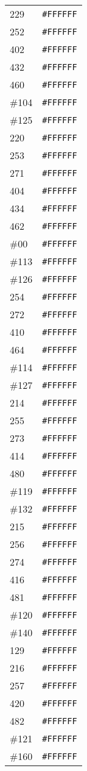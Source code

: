 \documentclass[a4paper]{article}
\begin{document}
\begin{longtable}{|l|r|}
229 & \texttt{\#FFFFFF} \\
252 & \texttt{\#FFFFFF} \\
402 & \texttt{\#FFFFFF} \\
432 & \texttt{\#FFFFFF} \\
460 & \texttt{\#FFFFFF} \\
\#104 & \texttt{\#FFFFFF} \\
\#125 & \texttt{\#FFFFFF} \\
220 & \texttt{\#FFFFFF} \\
253 & \texttt{\#FFFFFF} \\
271 & \texttt{\#FFFFFF} \\
404 & \texttt{\#FFFFFF} \\
434 & \texttt{\#FFFFFF} \\
462 & \texttt{\#FFFFFF} \\
\#00 & \texttt{\#FFFFFF} \\
\#113 & \texttt{\#FFFFFF} \\
\#126 & \texttt{\#FFFFFF} \\
254 & \texttt{\#FFFFFF} \\
272 & \texttt{\#FFFFFF} \\
410 & \texttt{\#FFFFFF} \\
464 & \texttt{\#FFFFFF} \\
\#114 & \texttt{\#FFFFFF} \\
\#127 & \texttt{\#FFFFFF} \\
214 & \texttt{\#FFFFFF} \\
255 & \texttt{\#FFFFFF} \\
273 & \texttt{\#FFFFFF} \\
414 & \texttt{\#FFFFFF} \\
480 & \texttt{\#FFFFFF} \\
\#119 & \texttt{\#FFFFFF} \\
\#132 & \texttt{\#FFFFFF} \\
215 & \texttt{\#FFFFFF} \\
256 & \texttt{\#FFFFFF} \\
274 & \texttt{\#FFFFFF} \\
416 & \texttt{\#FFFFFF} \\
481 & \texttt{\#FFFFFF} \\
\#120 & \texttt{\#FFFFFF} \\
\#140 & \texttt{\#FFFFFF} \\
129 & \texttt{\#FFFFFF} \\
216 & \texttt{\#FFFFFF} \\
257 & \texttt{\#FFFFFF} \\
420 & \texttt{\#FFFFFF} \\
482 & \texttt{\#FFFFFF} \\
\#121 & \texttt{\#FFFFFF} \\
\#160 & \texttt{\#FFFFFF} \\
\hline
\end{longtable}
\end{document}
